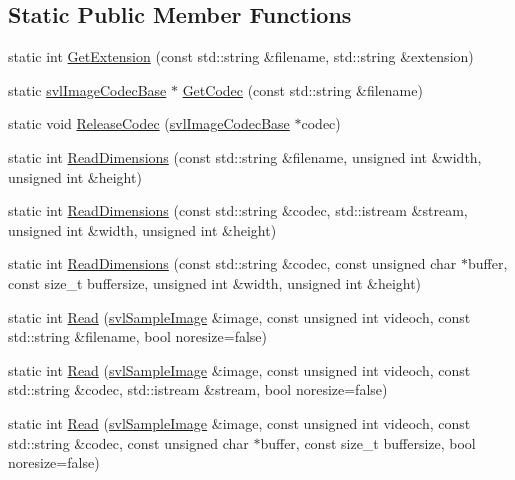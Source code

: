 \subsection*{Static Public Member Functions}
\begin{DoxyCompactItemize}
\item 
static int \hyperlink{classsvl_image_i_o_abb7a293f4b39b2302ccba01657e4eec0}{Get\-Extension} (const std\-::string \&filename, std\-::string \&extension)
\item 
static \hyperlink{classsvl_image_codec_base}{svl\-Image\-Codec\-Base} $\ast$ \hyperlink{classsvl_image_i_o_ae36e26b8aa46650cc3ea3ca0655d70b7}{Get\-Codec} (const std\-::string \&filename)
\item 
static void \hyperlink{classsvl_image_i_o_a33543ab73efe1e2e330a7402a826b675}{Release\-Codec} (\hyperlink{classsvl_image_codec_base}{svl\-Image\-Codec\-Base} $\ast$codec)
\item 
static int \hyperlink{classsvl_image_i_o_a9437d547489fe7a01f820fbdaa377431}{Read\-Dimensions} (const std\-::string \&filename, unsigned int \&width, unsigned int \&height)
\item 
static int \hyperlink{classsvl_image_i_o_a6341e68885499d632e34f89a8eeab21c}{Read\-Dimensions} (const std\-::string \&codec, std\-::istream \&stream, unsigned int \&width, unsigned int \&height)
\item 
static int \hyperlink{classsvl_image_i_o_ae4e0217577a16c269f22e91254964275}{Read\-Dimensions} (const std\-::string \&codec, const unsigned char $\ast$buffer, const size\-\_\-t buffersize, unsigned int \&width, unsigned int \&height)
\item 
static int \hyperlink{classsvl_image_i_o_a7b32537e65e950afa2c98779f6ea3aaa}{Read} (\hyperlink{classsvl_sample_image}{svl\-Sample\-Image} \&image, const unsigned int videoch, const std\-::string \&filename, bool noresize=false)
\item 
static int \hyperlink{classsvl_image_i_o_a19386cfa5b3627a925bacc2f1a437013}{Read} (\hyperlink{classsvl_sample_image}{svl\-Sample\-Image} \&image, const unsigned int videoch, const std\-::string \&codec, std\-::istream \&stream, bool noresize=false)
\item 
static int \hyperlink{classsvl_image_i_o_a1c4689a1c91acb189a320cf5fa93cade}{Read} (\hyperlink{classsvl_sample_image}{svl\-Sample\-Image} \&image, const unsigned int videoch, const std\-::string \&codec, const unsigned char $\ast$buffer, const size\-\_\-t buffersize, bool noresize=false)
\item 

\end{DoxyCompactItemize}
